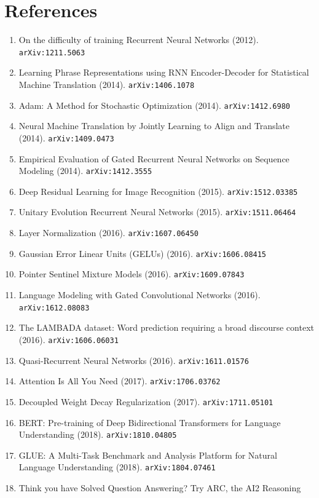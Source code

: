 \documentclass[11pt]{article}
\begin{document}
\section*{References}
\begin{enumerate}\small
  \item On the difficulty of training Recurrent Neural Networks (2012). \texttt{arXiv:1211.5063}
  \item Learning Phrase Representations using RNN Encoder-Decoder for
  Statistical Machine Translation (2014). \texttt{arXiv:1406.1078}
  \item Adam: A Method for Stochastic Optimization (2014). \texttt{arXiv:1412.6980}
  \item Neural Machine Translation by Jointly Learning to Align and Translate (2014). \texttt{arXiv:1409.0473}
  \item Empirical Evaluation of Gated Recurrent Neural Networks on Sequence
  Modeling (2014). \texttt{arXiv:1412.3555}
  \item Deep Residual Learning for Image Recognition (2015). \texttt{arXiv:1512.03385}
  \item Unitary Evolution Recurrent Neural Networks (2015). \texttt{arXiv:1511.06464}
  \item Layer Normalization (2016). \texttt{arXiv:1607.06450}
  \item Gaussian Error Linear Units (GELUs) (2016). \texttt{arXiv:1606.08415}
  \item Pointer Sentinel Mixture Models (2016). \texttt{arXiv:1609.07843}
  \item Language Modeling with Gated Convolutional Networks (2016). \texttt{arXiv:1612.08083}
  \item The LAMBADA dataset: Word prediction requiring a broad discourse context (2016). \texttt{arXiv:1606.06031}
  \item Quasi-Recurrent Neural Networks (2016). \texttt{arXiv:1611.01576}
  \item Attention Is All You Need (2017). \texttt{arXiv:1706.03762}
  \item Decoupled Weight Decay Regularization (2017). \texttt{arXiv:1711.05101}
  \item BERT: Pre-training of Deep Bidirectional Transformers for Language
  Understanding (2018). \texttt{arXiv:1810.04805}
  \item GLUE: A Multi-Task Benchmark and Analysis Platform for Natural Language
  Understanding (2018). \texttt{arXiv:1804.07461}
  \item Think you have Solved Question Answering? Try ARC, the AI2 Reasoning

\end{enumerate}
\end{document}
